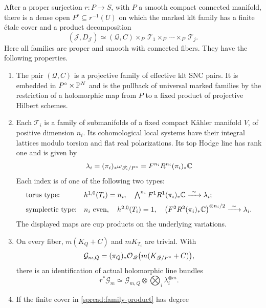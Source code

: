 \begin{proposition}\label{spread:product}
After a proper surjection \(r:P\to S\), with \(P\) a smooth compact
connected manifold, there is a dense open \(P^\circ\subseteq r^{-1}(U)\)
on which the marked klt family has a finite \'etale cover and a product
decomposition
\begin{equation}\label{spread:family-product}
 (\mathscr J,D_{\mathscr J})
 \simeq
 (\mathscr Q,C)\times_{P^\circ}
 \mathscr T_1\times_{P^\circ}\cdots\times_{P^\circ}\mathscr T_j .
\end{equation}
Here all families are proper and smooth with connected fibers.
They have the following properties.
\begin{enumerate}[label=\textup{(\roman*)}]
\item The pair \((\mathscr Q,C)\) is a projective family of effective
klt SNC pairs.  It is embedded in \(P^\circ\times\mathbb P^N\) and is the
pullback of universal marked families by the restriction of a
holomorphic map from \(P\) to a fixed product of projective Hilbert
schemes.
\item Each \(\mathscr T_i\) is a family of submanifolds of a fixed
compact K\"ahler manifold \(V\), of positive dimension \(n_i\).
Its cohomological local systems have their integral lattices modulo
torsion and flat real polarizations.  Its top Hodge line has rank one
and is given by
\[
 \lambda_i
 =(\pi_i)_*\omega_{\mathscr T_i/P^\circ}
 =F^{n_i}R^{n_i}(\pi_i)_*\mathbb C
\]
Each index is of one of the following two types:
\[
 \begin{array}{ll}
 \text{torus type:}&
 h^{1,0}(T_i)=n_i,\quad
 \bigwedge^{n_i}F^1R^1(\pi_i)_*\mathbb C
       \xrightarrow{\ \sim\ }\lambda_i;\\[2mm]
 \text{symplectic type:}&
 n_i\ \text{even},\quad h^{2,0}(T_i)=1,\quad
 \bigl(F^2R^2(\pi_i)_*\mathbb C\bigr)^{\otimes n_i/2}
       \xrightarrow{\ \sim\ }\lambda_i .
 \end{array}
\]
The displayed maps are cup products on the underlying variations.
\item On every fiber, \(m(K_Q+C)\) and \(mK_{T_i}\) are trivial.
With
\[
 \mathcal G_{m,Q}
   =(\pi_Q)_*\mathcal O_{\mathscr Q}
                  \bigl(m(K_{\mathscr Q/P^\circ}+C)\bigr),
\]
there is an identification of actual holomorphic line bundles
\begin{equation}\label{spread:volume-line}
 r^*\mathcal G_m
   \simeq \mathcal G_{m,Q}\otimes
                   \bigotimes_i\lambda_i^{\otimes m}.
\end{equation}
\item If the finite cover in \eqref{spread:family-product} has degree

\end{enumerate}
\end{proposition}
